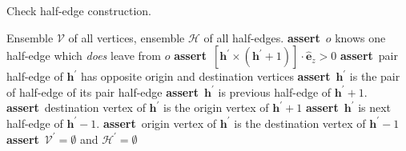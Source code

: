 \documentclass[aps, superscriptaddress, notitlepage]{revtex4-1}
\providecommand\ASSERT{\STATE\textbf{assert}~}
\begin{document}
\begin{algorithm}[H]
\caption{Check half-edge construction.}
\label{alg:check}
\begin{algorithmic}[1]
\REQUIRE Ensemble $\mathcal{V}$ of all vertices, ensemble $\mathcal{H}$ of all half-edges.
     
    \ENDIF
     
     
         
            \ASSERT $o$ knows one half-edge which \textit{does} leave from $o$
        \ENDIF
        \ASSERT $[\boldsymbol{h}^{\prime} \times (\boldsymbol{h}^{\prime} + 1)] \cdot \hat{\boldsymbol{e}}_z > 0$ 
        \ASSERT pair half-edge of $\boldsymbol{h}^{\prime}$ has opposite origin and destination vertices 
        \ASSERT $\boldsymbol{h}^{\prime}$ is the pair of half-edge of its pair half-edge
        \ASSERT $\boldsymbol{h}^{\prime}$ is previous half-edge of $\boldsymbol{h}^{\prime} + 1$. 
        \ASSERT destination vertex of $\boldsymbol{h}^{\prime}$ is the origin vertex of $\boldsymbol{h}^{\prime} + 1$
        \ASSERT $\boldsymbol{h}^{\prime}$ is next half-edge of $\boldsymbol{h}^{\prime} - 1$. 
        \ASSERT origin vertex of $\boldsymbol{h}^{\prime}$ is the destination vertex of $\boldsymbol{h}^{\prime} - 1$
    \ENDFOR
\ENDFOR
\ASSERT $\mathcal{V}^{\prime} = \emptyset$ and $\mathcal{H}^{\prime} = \emptyset$
\end{algorithmic}
\end{algorithm}
\end{document}
